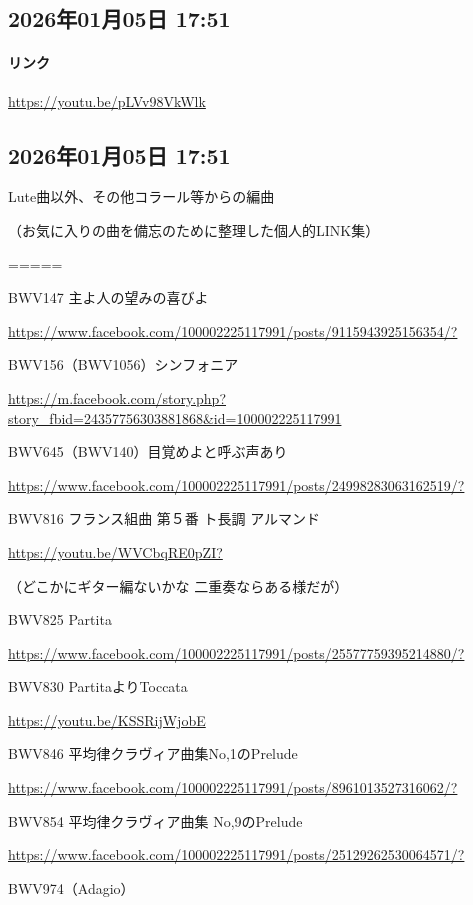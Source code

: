 \subsection*{2026年01月05日 17:51}

\paragraph{リンク}
\url{https://youtu.be/pLVv98VkWlk}

\subsection*{2026年01月05日 17:51}

Lute曲以外、その他コラール等からの編曲

（お気に入りの曲を備忘のために整理した個人的LINK集）

=====

BWV147 主よ人の望みの喜びよ

\url{https://www.facebook.com/100002225117991/posts/9115943925156354/?}

BWV156（BWV1056）シンフォニア

\url{https://m.facebook.com/story.php?story_fbid=24357756303881868&id=100002225117991}

BWV645（BWV140）目覚めよと呼ぶ声あり

\url{https://www.facebook.com/100002225117991/posts/24998283063162519/?}

BWV816 フランス組曲 第５番 ト長調 アルマンド

\url{https://youtu.be/WVCbqRE0pZI?}

（どこかにギター編ないかな 二重奏ならある様だが）

BWV825 Partita

\url{https://www.facebook.com/100002225117991/posts/25577759395214880/?}

BWV830 PartitaよりToccata

\url{https://youtu.be/KSSRijWjobE}

BWV846 平均律クラヴィア曲集No,1のPrelude

\url{https://www.facebook.com/100002225117991/posts/8961013527316062/?}

BWV854 平均律クラヴィア曲集 No,9のPrelude

\url{https://www.facebook.com/100002225117991/posts/25129262530064571/?}

BWV974（Adagio）

